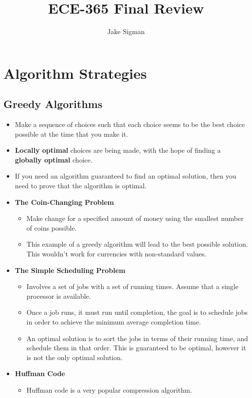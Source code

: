 \documentclass{article}
\title{ECE-365 Final Review}
\author{Jake Sigman}
\date{}
\begin{document}
\maketitle

\section*{Algorithm Strategies}
\subsection*{Greedy Algorithms}
\begin{itemize}
    \item Make a sequence of choices such that each choice seems to be the best choice possible at the time that you make it.
    \item \textbf{Locally optimal} choices are being made, with the hope of finding a \textbf{globally optimal} choice.
    \item If you need an algorithm guaranteed to find an optimal solution, then you need to prove that the algorithm is optimal.
    \item \textbf{The Coin-Changing Problem}
    \begin{itemize}
        \item Make change for a specified amount of money using the smallest number of coins possible.
        \item This example of a greedy algorithm will lead to the best possible solution. This wouldn't work for currencies with non-standard values.
    \end{itemize}
    \item \textbf{The Simple Scheduling Problem}
    \begin{itemize}
        \item Involves a set of jobs with a set of running times. Assume that a single processor is available.
        \item Once a job runs, it must run until completion, the goal is to schedule jobs in order to achieve the minimum average completion time.
        \item An optimal solution is to sort the jobs in terms of their running time, and schedule them in that order. This is guaranteed to be optimal, however it is not the only optimal solution.
    \end{itemize}
    \item \textbf{Huffman Code}
    \begin{itemize}
        \item Huffman code is a very popular compression algorithm.

\end{itemize}
\end{itemize}
\end{document}
